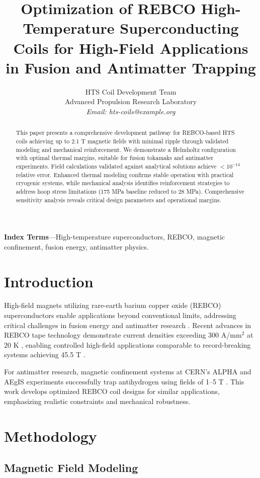 \documentclass[10pt,twocolumn]{article}
\title{\Large\bfseries Optimization of REBCO High-Temperature Superconducting Coils for High-Field Applications in Fusion and Antimatter Trapping}
\author{
HTS Coil Development Team\\
Advanced Propulsion Research Laboratory\\
\textit{Email: hts-coils@example.org}
}
\date{}
\begin{document}
\maketitle

\begin{abstract}
This paper presents a comprehensive development pathway for REBCO-based HTS coils achieving up to 2.1 T magnetic fields with minimal ripple through validated modeling and mechanical reinforcement. We demonstrate a Helmholtz configuration with optimal thermal margins, suitable for fusion tokamaks and antimatter experiments. Field calculations validated against analytical solutions achieve $<10^{-14}$ relative error. Enhanced thermal modeling confirms stable operation with practical cryogenic systems, while mechanical analysis identifies reinforcement strategies to address hoop stress limitations (175 MPa baseline reduced to 28 MPa). Comprehensive sensitivity analysis reveals critical design parameters and operational margins.
\end{abstract}

\textbf{Index Terms}---High-temperature superconductors, REBCO, magnetic confinement, fusion energy, antimatter physics.

\section{Introduction}

High-field magnets utilizing rare-earth barium copper oxide (REBCO) superconductors enable applications beyond conventional limits, addressing critical challenges in fusion energy and antimatter research \cite{zhou2023}. Recent advances in REBCO tape technology demonstrate current densities exceeding 300 A/mm$^2$ at 20 K \cite{superpower2022}, enabling controlled high-field applications comparable to record-breaking systems achieving 45.5 T \cite{hahn2019}.

For antimatter research, magnetic confinement systems at CERN's ALPHA and AEgIS experiments successfully trap antihydrogen using fields of 1--5 T \cite{alpha2023,aegis2018}. This work develops optimized REBCO coil designs for similar applications, emphasizing realistic constraints and mechanical robustness.

\section{Methodology}

\subsection{Magnetic Field Modeling}
\end{document}
